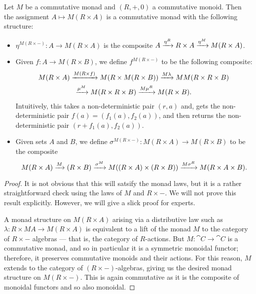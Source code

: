 \documentclass[DynamicalBook]{subfiles}
\begin{document}
\begin{proposition}
Let $M$ be a commutative monad and $(R, +, 0)$ a commutative monoid. Then the
assignment $A \mapsto M(R \times A)$ is a commutative monad with the following
structure:
\begin{itemize}
  \item $\eta^{M(R\times -)} : A \to M(R \times A)$ is the composite $A
    \xrightarrow{\eta^R} R \times A \xrightarrow{\eta^M} M(R \times A)$.
  \item Given $f : A \to M(R \times B)$, we define $f^{M(R \times -)}$ to be the
    following composite:
    \begin{multline*}
M(R \times A) \xrightarrow{M(R \times f)} M(R \times M(R \times B)) \xrightarrow{M\lambda} MM(R \times R \times B)\\\xrightarrow{\mu^{M}} M(R \times R \times B) \xrightarrow{M\mu^R} M(R \times B).
      \end{multline*}
 Intuitively, this takes a non-deterministic pair $(r, a)$ and, gets the
 non-deterministic pair $f(a) = (f_1(a), f_2(a))$, and then returns the
 non-deterministic pair $(r + f_1(a), f_2(a))$.
  \item Given sets $A$ and $B$, we define $\sigma^{M(R \times -)} : M(R \times
    A) \to M(R \times B)$ to be the composite
    \[
M(R \times A) \xrightarrow{M}(R \times B) \xrightarrow{\sigma^M} M((R \times A) \times (R \times
B)) \xrightarrow{M\sigma^R} M(R \times A \times B).
    \]
\end{itemize}
\end{proposition}
\begin{proof}
It is not obvious that this will satsify the monad laws, but it is a rather
straightforward check using the laws of $M$ and $R \times -$. We will not prove
this result explicitly. However, we will give a slick proof for experts.

A monad structure on $M(R \times A)$ arising via a distributive law such as
$\lambda : R \times MA \to M(R \times A)$ is equivalent to a lift of the monad
$M$ to the category of $R \times -$ algebras --- that is, the category of
$R$-actions. But $M : \cat{C} \to \cat{C}$ is a commutative monad, and so in particular it is a
symmetric monoidal functor; therefore, it preserves commutative monoids and
their actions. For this reason, $M$ extends to the category of $(R \times -)$-algebras, giving
us the desired monad structure on $M(R \times -)$. This is again commutative as
it is the composite of monoidal functors and so also monoidal.
\end{proof}
\end{document}
